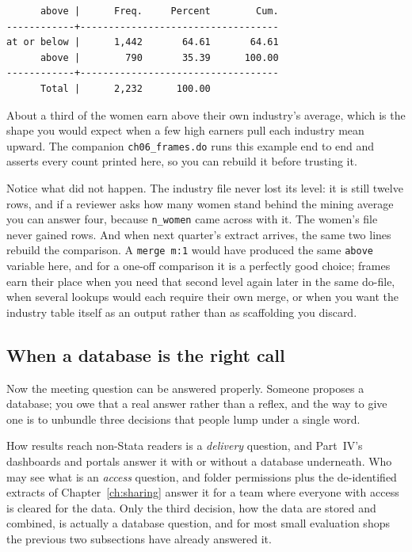 \documentclass[
    a4paper,
    fontsize=10pt,
    twoside=true,
    numbers=noenddot,
]{kaobook}
\begin{document}
\par
{\footnotesize
\begin{verbatim}
      above |      Freq.     Percent        Cum.
------------+-----------------------------------
at or below |      1,442       64.61       64.61
      above |        790       35.39      100.00
------------+-----------------------------------
      Total |      2,232      100.00
\end{verbatim}
}
About a third of the women earn above their own industry's average, which is the shape you would expect when a few high earners pull each industry mean upward. The companion \texttt{ch06\_frames.do} runs this example end to end and asserts every count printed here, so you can rebuild it before trusting it.

Notice what did not happen. The industry file never lost its level: it is still twelve rows, and if a reviewer asks how many women stand behind the mining average you can answer four, because \texttt{n\_women} came across with it. The women's file never gained rows. And when next quarter's extract arrives, the same two lines rebuild the comparison. A \texttt{merge m:1} would have produced the same \texttt{above} variable here, and for a one-off comparison it is a perfectly good choice; frames earn their place when you need that second level again later in the same do-file, when several lookups would each require their own merge, or when you want the industry table itself as an output rather than as scaffolding you discard.

\subsection{When a database is the right call}\label{sec:ch06-dbcase}
Now the meeting question can be answered properly. Someone proposes a database; you owe that a real answer rather than a reflex, and the way to give one is to unbundle three decisions that people lump under a single word.

How results reach non-Stata readers is a \emph{delivery} question, and Part~IV's dashboards and portals answer it with or without a database underneath. Who may see what is an \emph{access} question, and folder permissions plus the de-identified extracts of Chapter~\ref{ch:sharing} answer it for a team where everyone with access is cleared for the data. Only the third decision, how the data are stored and combined, is actually a database question, and for most small evaluation shops the previous two subsections have already answered it.
\end{document}
